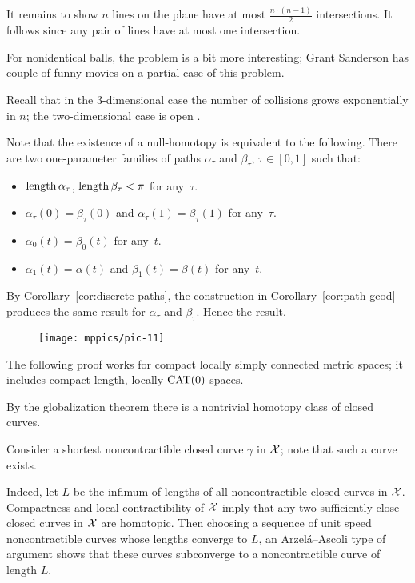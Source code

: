 It remains to show $n$ lines on the plane have at most $\tfrac{n\cdot(n-1)}2$ intersections.
It follows since any pair of lines have at most one intersection.

For nonidentical balls, the problem is a bit more interesting;
Grant Sanderson \cite{sanderson} has couple of funny movies on a partial case of this problem.

Recall that in the 3-dimensional case the number of collisions grows exponentially in $n$; the two-dimensional case is open \cite{burago-ivanov}.

Note that the existence of a null-homotopy is equivalent to the following.
There are two one-parameter families of paths $\alpha_\tau$ and $\beta_\tau$, $\tau\in[0,1]$ 
such that: 
\begin{itemize}
\item $\mathop{\rm length}\nolimits\alpha_\tau$, $\mathop{\rm length}\nolimits\beta_\tau<\pi$ for any~$\tau$.
\item $\alpha_\tau(0)=\beta_\tau(0)$ and $\alpha_\tau(1)=\beta_\tau(1)$ for any~$\tau$.
\item $\alpha_0(t)=\beta_0(t)$ for any~$t$.
\item $\alpha_1(t)=\alpha(t)$ and $\beta_1(t)=\beta(t)$ for any~$t$.
\end{itemize}

By Corollary~\ref{cor:discrete-paths},
the construction in Corollary~\ref{cor:path-geod} produces the same result for $\alpha_\tau$ and $\beta_\tau$.
Hence the result.


\begin{wrapfigure}{r}{25 mm}
\vskip-4mm
\centering
\texttt{[image: mppics/pic-11]}
\end{wrapfigure}

The following proof works for compact locally simply connected metric spaces;
it includes compact length, locally $\mathrm{CAT}(0)$ spaces. 

\medskip


By the globalization theorem there is  a nontrivial homotopy class of closed curves.

Consider a shortest noncontractible closed curve $\gamma$ in  $\mathcal{X}$;
note that such a curve exists.

Indeed, let $L$ be the infimum of lengths of all noncontractible closed curves in $\mathcal{X}$.
Compactness and local contractibility of $\mathcal{X}$ imply that any two sufficiently close closed curves in $\mathcal{X}$ are homotopic.
Then choosing a sequence of unit speed noncontractible curves whose lengths converge to $L$, an Arzel\'{a}--Ascoli type of argument shows that these curves subconverge to a noncontractible curve of length $L$.


